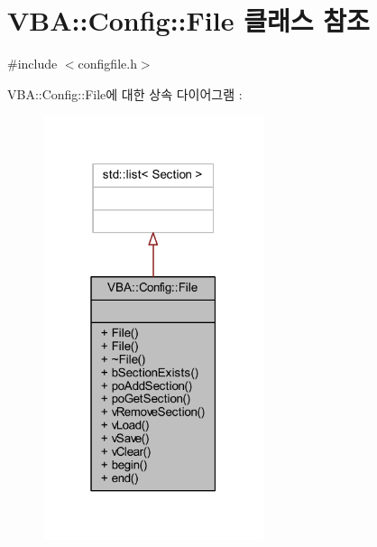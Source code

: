 \hypertarget{class_v_b_a_1_1_config_1_1_file}{}\section{V\+BA\+:\+:Config\+:\+:File 클래스 참조}
\label{class_v_b_a_1_1_config_1_1_file}


{\ttfamily \#include $<$configfile.\+h$>$}



V\+BA\+:\+:Config\+:\+:File에 대한 상속 다이어그램 \+: \nopagebreak
\begin{figure}[H]
\begin{center}
\leavevmode
\includegraphics[width=183pt]{class_v_b_a_1_1_config_1_1_file__inherit__graph}
\end{center}
\end{figure}


